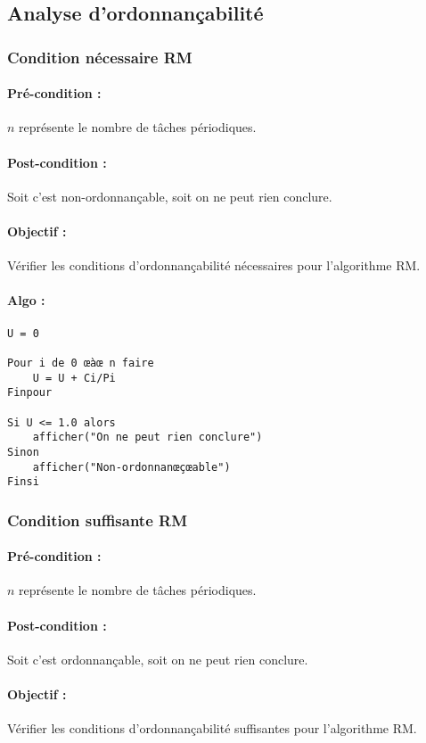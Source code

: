 		
		\subsection{Analyse d'ordonnançabilité}
			
			\subsubsection{Condition nécessaire RM}
				\paragraph{Pré-condition :} $n$ représente le nombre de tâches périodiques.
				\paragraph{Post-condition :} Soit c'est non-ordonnançable, soit on ne peut rien conclure.
				\paragraph{Objectif :} Vérifier les conditions d'ordonnançabilité nécessaires pour l'algorithme RM.
				\paragraph{Algo :} 
					\begin{lstlisting}
U = 0
					
Pour i de 0 œàœ n faire
	U = U + Ci/Pi
Finpour		

Si U <= 1.0 alors
	afficher("On ne peut rien conclure")
Sinon
	afficher("Non-ordonnanœçœable")
Finsi
					\end{lstlisting}
			
			\subsubsection{Condition suffisante RM}
				\paragraph{Pré-condition :} $n$ représente le nombre de tâches périodiques.
				\paragraph{Post-condition :} Soit c'est ordonnançable, soit on ne peut rien conclure.
				\paragraph{Objectif :} Vérifier les conditions d'ordonnançabilité suffisantes pour l'algorithme RM.
